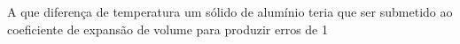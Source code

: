 A que diferença de temperatura um sólido de alumínio teria que ser submetido ao coeficiente de expansão de volume para produzir erros de 1%

